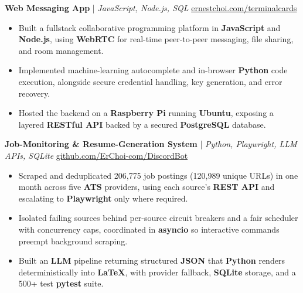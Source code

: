 \documentclass[11pt]{article}
\begin{document}

\textbf{Web Messaging App} | \textit{JavaScript, Node.js, SQL} \hfill \href{https://www.ernestchoi.com/terminalcards/roomEnter.html}{ernestchoi.com/terminalcards} \\
\begin{itemize}
  \item Built a fullstack collaborative programming platform in \textbf{JavaScript} and \textbf{Node.js}, using \textbf{WebRTC} for real-time peer-to-peer messaging, file sharing, and room management.
  \item Implemented machine-learning autocomplete and in-browser \textbf{Python} code execution, alongside secure credential handling, key generation, and error recovery.
  \item Hosted the backend on a \textbf{Raspberry Pi} running \textbf{Ubuntu}, exposing a layered \textbf{RESTful API} backed by a secured \textbf{PostgreSQL} database.
\end{itemize}

\textbf{Job-Monitoring \& Resume-Generation System} | \textit{Python, Playwright, LLM APIs, SQLite} \hfill \href{https://github.com/ErChoi-com/DiscordBot}{github.com/ErChoi-com/DiscordBot} \\
\begin{itemize}
  \item Scraped and deduplicated 206,775 job postings (120,989 unique URLs) in one month across five \textbf{ATS} providers, using each source's \textbf{REST API} and escalating to \textbf{Playwright} only where required.
  \item Isolated failing sources behind per-source circuit breakers and a fair scheduler with concurrency caps, coordinated in \textbf{asyncio} so interactive commands preempt background scraping.
  \item Built an \textbf{LLM} pipeline returning structured \textbf{JSON} that \textbf{Python} renders deterministically into \textbf{LaTeX}, with provider fallback, \textbf{SQLite} storage, and a 500+ test \textbf{pytest} suite.
\end{itemize}
\end{document}
